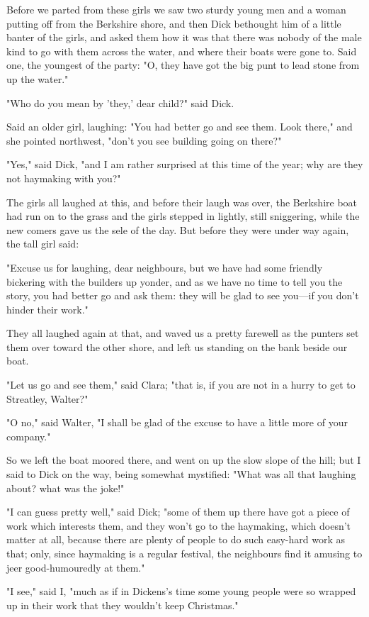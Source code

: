 Before we parted from these girls we saw two sturdy young men and a
woman putting off from the Berkshire shore, and then Dick bethought him
of a little banter of the girls, and asked them how it was that there
was nobody of the male kind to go with them across the water, and where
their boats were gone to. Said one, the youngest of the party: "O, they
have got the big punt to lead stone from up the water."

"Who do you mean by 'they,' dear child?" said Dick.

Said an older girl, laughing: "You had better go and see them. Look
there," and she pointed northwest, "don't you see building going on
there?"

"Yes," said Dick, "and I am rather surprised at this time of the year;
why are they not haymaking with you?"

The girls all laughed at this, and before their laugh was over, the
Berkshire boat had run on to the grass and the girls stepped in lightly,
still sniggering, while the new comers gave us the sele of the day. But
before they were under way again, the tall girl said:

"Excuse us for laughing, dear neighbours, but we have had some friendly
bickering with the builders up yonder, and as we have no time to tell
you the story, you had better go and ask them: they will be glad to see
you---if you don't hinder their work."

They all laughed again at that, and waved us a pretty farewell as the
punters set them over toward the other shore, and left us standing on
the bank beside our boat.

"Let us go and see them," said Clara; "that is, if you are not in a
hurry to get to Streatley, Walter?"

"O no," said Walter, "I shall be glad of the excuse to have a little
more of your company."

So we left the boat moored there, and went on up the slow slope of the
hill; but I said to Dick on the way, being somewhat mystified: "What was
all that laughing about? what was the joke!"

"I can guess pretty well," said Dick; "some of them up there have got a
piece of work which interests them, and they won't go to the haymaking,
which doesn't matter at all, because there are plenty of people to do
such easy-hard work as that; only, since haymaking is a regular
festival, the neighbours find it amusing to jeer good-humouredly at
them."

"I see," said I, "much as if in Dickens's time some young people were so
wrapped up in their work that they wouldn't keep Christmas."

